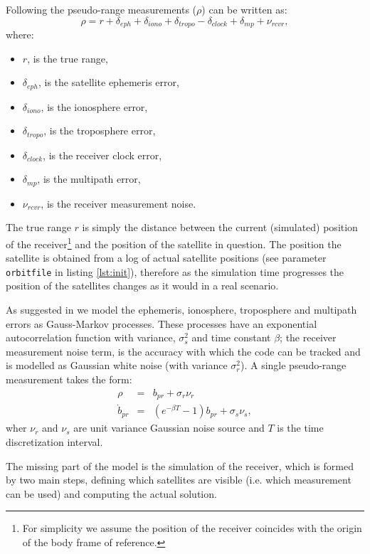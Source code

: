 \documentclass[a4paper,11pt]{report}
\begin{document}
Following \cite{rankin1994anerror} the pseudo-range measurements ($\rho$) can be written as:  
\begin{equation}
\rho=r+\delta_{eph}+\delta_{iono}+\delta_{tropo}-\delta_{clock}+\delta_{mp}+\nu_{rcvr},
\end{equation}
where:
\begin{itemize}
\item $r$, is the true range,
\item $\delta_{eph}$, is the satellite ephemeris error,
\item $\delta_{iono}$, is the ionosphere error,
\item $\delta_{tropo}$, is the troposphere error,
\item $\delta_{clock}$, is the receiver clock error,
\item $\delta_{mp}$, is the multipath error,
\item $\nu_{rcvr}$, is the receiver measurement noise.
\end{itemize}
The true range $r$ is simply the distance between the current (simulated) position of the receiver\footnote{For simplicity we assume the position of the receiver coincides with the origin of the body frame of reference.} and the position of the satellite in question. The position the satellite is obtained from a log of actual satellite positions (see parameter \texttt{orbitfile} in listing \ref{lst:init}), therefore as the simulation time progresses the position of the satellites changes as it would in a real scenario.

As suggested in \cite{rankin1994anerror} we model the ephemeris, ionosphere, troposphere and multipath errors as Gauss-Markov processes. These processes have an exponential autocorrelation function with variance, $\sigma^2_s$ and time constant $\beta$; the receiver measurement noise term, is the accuracy with which the code can be tracked and is modelled as Gaussian white noise (with variance $\sigma^2_r$).
A single pseudo-range measurement takes the form:
\begin{eqnarray}
\rho & = & b_{pr} + \sigma_r\nu_{r}\\
\dot{b}_{pr} & = & (e^{-\beta T}-1) b_{pr} + \sigma_s\nu_{s},
\end{eqnarray}
wher $\nu_r$ and $\nu_s$ are unit variance Gaussian noise source and $T$ is the time discretization interval.  

The missing part of the model is the simulation of the receiver, which is formed by two main steps, defining which satellites are visible (i.e. which measurement can be used) and computing the actual solution.
\end{document}
